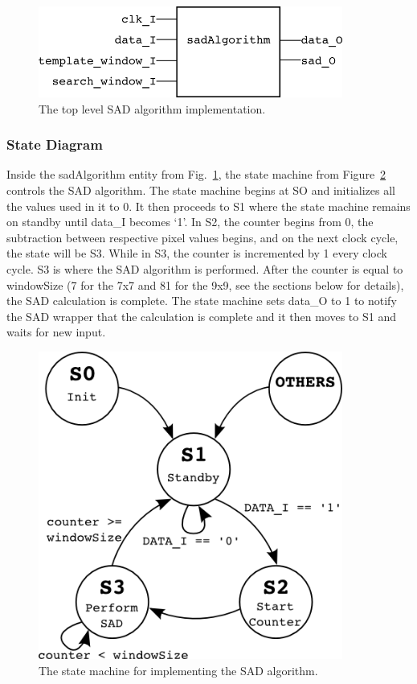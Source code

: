 \begin{figure}[h]
	\begin{center}
		\includegraphics[width=100mm]{figures/sadAlgorithm_rtl.png}
		\captionfonts
		\caption{The top level SAD algorithm implementation.}
		\label{fig:sadAlg_rtl}
	\end{center}
\end{figure}


\subsubsection{State Diagram}

Inside the sadAlgorithm entity from Fig.~\ref{fig:sadAlg_rtl}, the state machine from Figure~\ref{fig:stateMachine} controls the SAD algorithm. The state machine begins at SO and initializes all the values used in it to 0. It then proceeds to S1 where the state machine remains on standby until data\_I becomes `1'. In S2, the counter begins from 0, the subtraction between respective pixel values begins, and on the next clock cycle, the state will be S3. While in S3, the counter is incremented by 1 every clock cycle. S3 is where the SAD algorithm is performed. After the counter is equal to windowSize (7 for the 7x7 and 81 for the 9x9, see the sections below for details), the SAD calculation is complete. The state machine sets data\_O to 1 to notify the SAD wrapper that the calculation is complete and it then moves to S1 and waits for new input.

\begin{figure}[h]
	\begin{center}
		\includegraphics[width=100mm]{figures/stateMachine.png}
		\captionfonts
		\caption{The state machine for implementing the SAD algorithm.}
		\label{fig:stateMachine}
	\end{center}
\end{figure}


